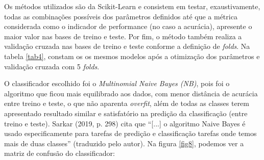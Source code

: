 \documentclass[twocolumn]{rbef}
\newcommand{\1}{\mathbbm{1}}
\begin{document}
\newline\linebreak Os métodos utilizados são da Scikit-Learn e consistem em testar, exaustivamente, todas as combinações possíveis dos parâmetros definidos até que a métrica considerada como o indicador de performance (no caso a acurácia), apresente o maior valor nas bases de treino e teste. Por fim, o método também realiza a validação cruzada nas bases de treino e teste conforme a definição de \emph{folds}. Na tabela \ref{tab4}, constam os os mesmos modelos após a otimização dos parâmetros e validação cruzada com 5 \emph{folds}.
\begin{table}[!htb]
\caption{Classificadores: hiperparâmetros otimizados}
\label{tab4}
\end{table}
\newline\linebreak O classificador escolhido foi o \emph{Multinomial Naive Bayes (NB)}, pois foi o algoritmo que ficou mais equilibrado aos dados, com menor distância de acurácia entre treino e teste, o que não aparenta \emph{overfit}, além de todas as classes terem apresentado resultado similar e satisfatório na predição da classificação (entre treino e teste). Sarkar (2019, p. 298)\cite{SARKAR} cita que “[...] o algoritmo Naive Bayes é usado especificamente para tarefas de predição e classificação tarefas onde temos mais de duas classes” (traduzido pelo autor).  Na figura \ref{fig8}, podemos ver a matriz de confusão do classificador:
\end{document}
